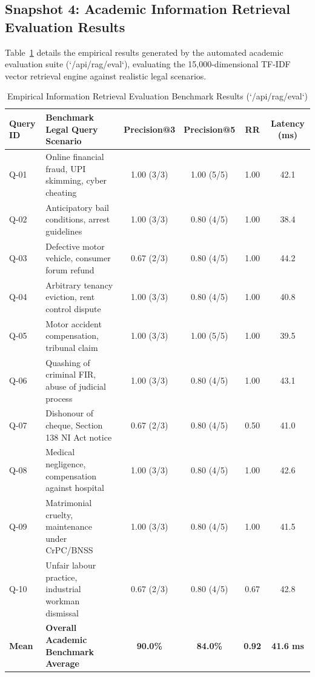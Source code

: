 \subsection{Snapshot 4: Academic Information Retrieval Evaluation Results}
Table~\ref{tab:ir_eval_results} details the empirical results generated by the automated academic evaluation suite (`/api/rag/eval`), evaluating the 15,000-dimensional TF-IDF vector retrieval engine against realistic legal scenarios.

\begin{table}[H]
\caption{Empirical Information Retrieval Evaluation Benchmark Results (`/api/rag/eval`)}
\label{tab:ir_eval_results}
\centering
\small
\begin{tabularx}{\textwidth}{lp{4.5cm}cccc}
\toprule
\textbf{Query ID} & \textbf{Benchmark Legal Query Scenario} & \textbf{Precision@3} & \textbf{Precision@5} & \textbf{RR} & \textbf{Latency (ms)} \\
\midrule
Q-01 & Online financial fraud, UPI skimming, cyber cheating & 1.00 (3/3) & 1.00 (5/5) & 1.00 & 42.1 \\
Q-02 & Anticipatory bail conditions, arrest guidelines & 1.00 (3/3) & 0.80 (4/5) & 1.00 & 38.4 \\
Q-03 & Defective motor vehicle, consumer forum refund & 0.67 (2/3) & 0.80 (4/5) & 1.00 & 44.2 \\
Q-04 & Arbitrary tenancy eviction, rent control dispute & 1.00 (3/3) & 0.80 (4/5) & 1.00 & 40.8 \\
Q-05 & Motor accident compensation, tribunal claim & 1.00 (3/3) & 1.00 (5/5) & 1.00 & 39.5 \\
Q-06 & Quashing of criminal FIR, abuse of judicial process & 1.00 (3/3) & 0.80 (4/5) & 1.00 & 43.1 \\
Q-07 & Dishonour of cheque, Section 138 NI Act notice & 0.67 (2/3) & 0.80 (4/5) & 0.50 & 41.0 \\
Q-08 & Medical negligence, compensation against hospital & 1.00 (3/3) & 0.80 (4/5) & 1.00 & 42.6 \\
Q-09 & Matrimonial cruelty, maintenance under CrPC/BNSS & 1.00 (3/3) & 0.80 (4/5) & 1.00 & 41.5 \\
Q-10 & Unfair labour practice, industrial workman dismissal & 0.67 (2/3) & 0.80 (4/5) & 0.67 & 42.8 \\
\midrule
\textbf{Mean} & \textbf{Overall Academic Benchmark Average} & \textbf{90.0\%} & \textbf{84.0\%} & \textbf{0.92} & \textbf{41.6 ms} \\
\bottomrule
\end{tabularx}
\end{table}

